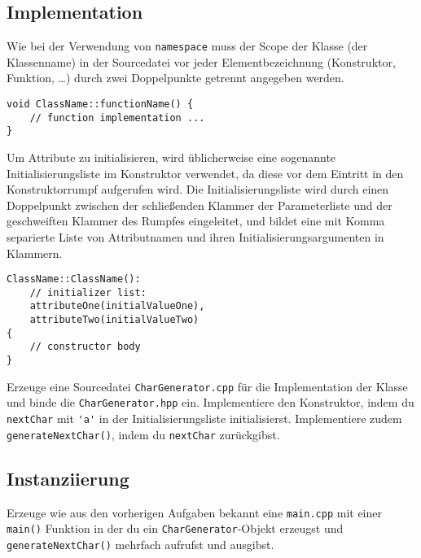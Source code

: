 \subsection{Implementation}
Wie bei der Verwendung von \lstinline{namespace} muss der Scope der Klasse (der Klassenname) in der Sourcedatei vor jeder Elementbezeichnung (Konstruktor, Funktion, \dots) durch zwei Doppelpunkte getrennt angegeben werden.

\begin{lstlisting}
void ClassName::functionName() {
	// function implementation ...
}
\end{lstlisting}

Um Attribute zu initialisieren, wird üblicherweise eine sogenannte Initialisierungsliste im Konstruktor verwendet, da diese vor dem Eintritt in den Konstruktorrumpf aufgerufen wird.
Die Initialisierungsliste wird durch einen Doppelpunkt zwischen der schließenden Klammer der Parameterliste und der geschweiften Klammer des Rumpfes eingeleitet, und bildet eine mit Komma separierte Liste von Attributnamen und ihren Initialisierungsargumenten in Klammern.

\begin{lstlisting}
ClassName::ClassName():
	// initializer list:
	attributeOne(initialValueOne),
	attributeTwo(initialValueTwo)
{
	// constructor body
}
\end{lstlisting}

Erzeuge eine Sourcedatei \texttt{CharGenerator.cpp} für die Implementation der Klasse und binde die \texttt{CharGenerator.hpp} ein.
Implementiere den Konstruktor, indem du \lstinline{nextChar} mit \lstinline{'a'} in der Initialisierungsliste initialisierst.
Implementiere zudem \texttt{generateNextChar()}, indem du \texttt{nextChar} zurückgibst.


\subsection{Instanziierung}
Erzeuge wie aus den vorherigen Aufgaben bekannt eine \texttt{main.cpp} mit einer \texttt{main()} Funktion in der du ein \texttt{CharGenerator}-Objekt erzeugst und \texttt{generateNextChar()} mehrfach aufrufst und ausgibst.

